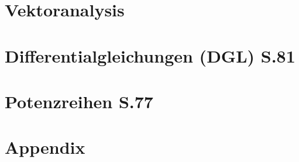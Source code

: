 \documentclass[8pt]{mpscheatsheet}
\begin{document}
    \section{Vektoranalysis}
        
        
        \vspace{-0.25em}
        
        
        
    \cbreak
    \section{Differentialgleichungen (DGL) \texorpdfstring{\hfill S.81}{S.81}}
        
        
        
        
        
        
        
    \cbreak
        
        
        
        
    \cbreak
    \section{Potenzreihen \texorpdfstring{\hfill  S.77}{ S.77}}
        
        
        
    \newpage 
        \section{Appendix}
        
        
        
    \cbreak
        
\end{document}
